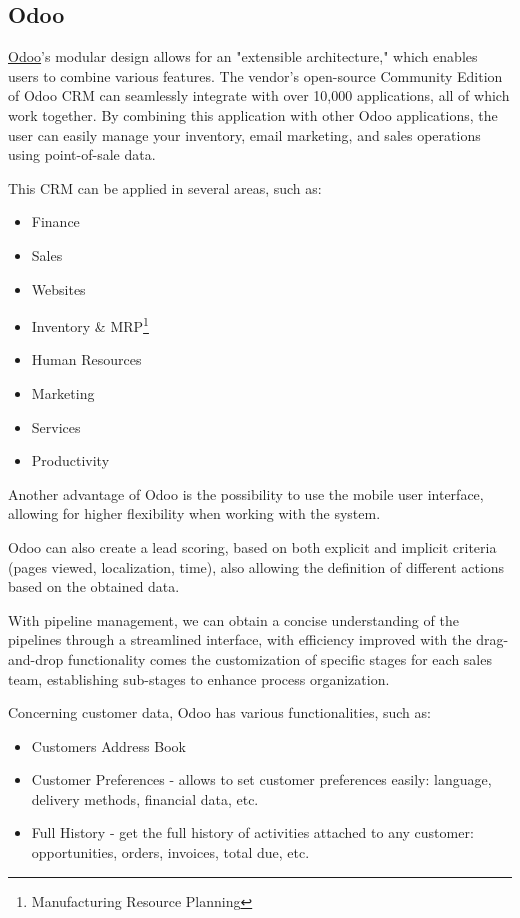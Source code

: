 \documentclass{article}
\begin{document}
\subsection{Odoo}

\href{https://www.odoo.com/m}{Odoo}'s modular design allows for an "extensible architecture," which enables users to combine various features. The vendor's open-source Community Edition of Odoo CRM can seamlessly integrate with over 10,000 applications, all of which work together. By combining this application with other Odoo applications, the user can easily manage your inventory, email marketing, and sales operations using point-of-sale data.

This CRM can be applied in several areas, such as:

\begin{itemize}
    \item Finance
    \item Sales
    \item Websites
    \item Inventory \& MRP\footnote{Manufacturing Resource Planning}
    \item Human Resources
    \item Marketing
    \item Services
    \item Productivity
\end{itemize}

Another advantage of Odoo is the possibility to use the mobile user interface, allowing for higher flexibility when working with the system.

Odoo can also create a lead scoring, based on both explicit and implicit criteria (pages viewed, localization, time), also allowing the definition of different actions based on the obtained data.

With pipeline management, we can obtain a concise understanding of the pipelines through a streamlined interface, with efficiency improved with the drag-and-drop functionality comes the customization of specific stages for each sales team, establishing sub-stages to enhance process organization. 

Concerning customer data, Odoo has various functionalities, such as: 

\begin{itemize}
    \item Customers Address Book
    \item Customer Preferences - allows to set customer preferences easily: language, delivery methods, financial data, etc.
    \item Full History - get the full history of activities attached to any customer: opportunities, orders, invoices, total due, etc.
\end{itemize}
\end{document}
